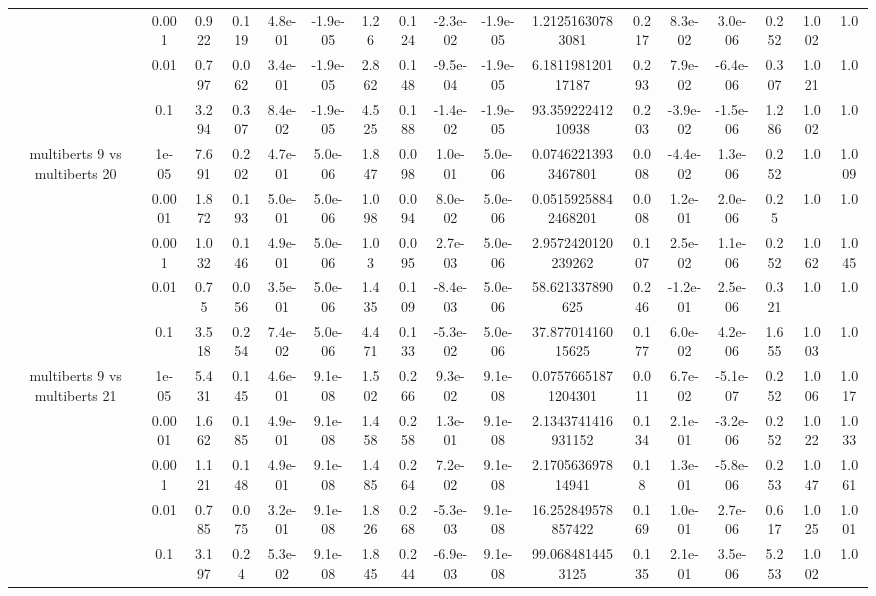 \begin{tabular}{|c|c|c|c|c|c|c|c|c|c|c|c|c|c|c|c|c|}
 & 0.001 & 0.922 & 0.119 & 4.8e-01 & -1.9e-05 & 1.26 & 0.124 & -2.3e-02 & -1.9e-05 & 1.21251630783081 & 0.217 & 8.3e-02 & 3.0e-06 & 0.252 & 1.002 & 1.0 \\
 & 0.01 & 0.797 & 0.062 & 3.4e-01 & -1.9e-05 & 2.862 & 0.148 & -9.5e-04 & -1.9e-05 & 6.181198120117187 & 0.293 & 7.9e-02 & -6.4e-06 & 0.307 & 1.021 & 1.0 \\
 & 0.1 & 3.294 & 0.307 & 8.4e-02 & -1.9e-05 & 4.525 & 0.188 & -1.4e-02 & -1.9e-05 & 93.35922241210938 & 0.203 & -3.9e-02 & -1.5e-06 & 1.286 & 1.002 & 1.0 \\
\hline
\multirow{5}{*}{multiberts 9 vs multiberts 20} & 1e-05 & 7.691 & 0.202 & 4.7e-01 & 5.0e-06 & 1.847 & 0.098 & 1.0e-01 & 5.0e-06 & 0.07462213933467801 & 0.008 & -4.4e-02 & 1.3e-06 & 0.252 & 1.0 & 1.009 \\
 & 0.0001 & 1.872 & 0.193 & 5.0e-01 & 5.0e-06 & 1.098 & 0.094 & 8.0e-02 & 5.0e-06 & 0.05159258842468201 & 0.008 & 1.2e-01 & 2.0e-06 & 0.25 & 1.0 & 1.0 \\
 & 0.001 & 1.032 & 0.146 & 4.9e-01 & 5.0e-06 & 1.03 & 0.095 & 2.7e-03 & 5.0e-06 & 2.9572420120239262 & 0.107 & 2.5e-02 & 1.1e-06 & 0.252 & 1.062 & 1.045 \\
 & 0.01 & 0.75 & 0.056 & 3.5e-01 & 5.0e-06 & 1.435 & 0.109 & -8.4e-03 & 5.0e-06 & 58.621337890625 & 0.246 & -1.2e-01 & 2.5e-06 & 0.321 & 1.0 & 1.0 \\
 & 0.1 & 3.518 & 0.254 & 7.4e-02 & 5.0e-06 & 4.471 & 0.133 & -5.3e-02 & 5.0e-06 & 37.87701416015625 & 0.177 & 6.0e-02 & 4.2e-06 & 1.655 & 1.003 & 1.0 \\
\hline
\multirow{5}{*}{multiberts 9 vs multiberts 21} & 1e-05 & 5.431 & 0.145 & 4.6e-01 & 9.1e-08 & 1.502 & 0.266 & 9.3e-02 & 9.1e-08 & 0.07576651871204301 & 0.011 & 6.7e-02 & -5.1e-07 & 0.252 & 1.006 & 1.017 \\
 & 0.0001 & 1.662 & 0.185 & 4.9e-01 & 9.1e-08 & 1.458 & 0.258 & 1.3e-01 & 9.1e-08 & 2.1343741416931152 & 0.134 & 2.1e-01 & -3.2e-06 & 0.252 & 1.022 & 1.033 \\
 & 0.001 & 1.121 & 0.148 & 4.9e-01 & 9.1e-08 & 1.485 & 0.264 & 7.2e-02 & 9.1e-08 & 2.170563697814941 & 0.18 & 1.3e-01 & -5.8e-06 & 0.253 & 1.047 & 1.061 \\
 & 0.01 & 0.785 & 0.075 & 3.2e-01 & 9.1e-08 & 1.826 & 0.268 & -5.3e-03 & 9.1e-08 & 16.252849578857422 & 0.169 & 1.0e-01 & 2.7e-06 & 0.617 & 1.025 & 1.001 \\
 & 0.1 & 3.197 & 0.24 & 5.3e-02 & 9.1e-08 & 1.845 & 0.244 & -6.9e-03 & 9.1e-08 & 99.0684814453125 & 0.135 & 2.1e-01 & 3.5e-06 & 5.253 & 1.002 & 1.0 \\

\end{tabular}
